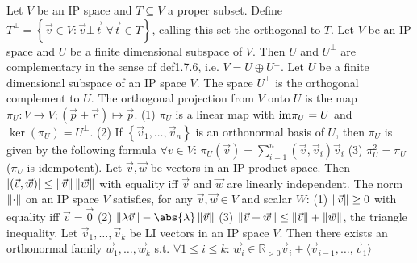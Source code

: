  Let $V$ be an IP space and $T \subseteq V$ a proper subset.
Define $T^{\bot} = \left\{ \vec{v} \in V : \vec{v} \bot \vec{t} \; \forall \vec{t} \in T \right\}$, calling this set the orthogonal to $T$.
 Let $V$ be an IP space and $U$ be a finite dimensional subspace of $V$.
Then $U$ and $U^{\bot}$ are complementary in the sense of def1.7.6, i.e. $V = U \oplus U^{\bot}$.
 Let $U$ be a finite dimensional subspace of an IP space $V$. The space $U^{\bot}$ is the orthogonal complement to $U$. The orthogonal projection from $V$ onto $U$ is the map $\pi_U : V \to V; (\vec{p} + \vec{r}) \mapsto \vec{p}$.
(1) $\pi_U$ is a linear map with $\text{im}{\pi_U} = U$ and $\ker(\pi_U) = U^{\bot}$.
(2) If $\left\{ \vec{v}_1, \dots, \vec{v}_n \right\}$ is an orthonormal basis of $U$, then $\pi_U$ is given by the following formula $\forall v \in V$: $\pi_U(\vec{v}) = \sum_{i=1}^n (\vec{v}, \vec{v}_i)\vec{v}_i$
(3) $\pi_U^2 = \pi_U$ ($\pi_U$ is idempotent).
 Let $\vec{v}, \vec{w}$ be vectors in an IP product space. Then $|(\vec{v}, \vec{w})| \le \left\lVert \vec{v} \right\rVert\left\lVert \vec{w} \right\rVert$ with equality iff $\vec{v}$ and $\vec{w}$ are linearly independent.
 The norm $\left\lVert \cdot \right\rVert$ on an IP space $V$ satisfies, for any $\vec{v}, \vec{w} \in V$ and scalar $W$:
(1) $\left\lVert \vec{v} \right\rVert \ge 0$ with equality iff $\vec{v} = \vec{0}$
(2) $\norm{\lambda \vec{v}} - \abs{\lambda} \norm{\vec{v}}$
(3) $\left\lVert \vec{v} + \vec{w} \right\rVert \le \left\lVert \vec{v} \right\rVert + \left\lVert \vec{w} \right\rVert$, the triangle inequality.
 Let $\vec{v}_1, \dots, \vec{v}_k$ be LI vectors in an IP space $V$. Then there exists an orthonormal family $\vec{w}_1, \dots, \vec{w}_k$ s.t. $\forall 1 \le i \le k$: $\vec{w}_i \in \mathbb{R}_{> 0}\vec{v}_i + \langle \vec{v}_{i-1}, \dots, \vec{v}_1 \rangle$